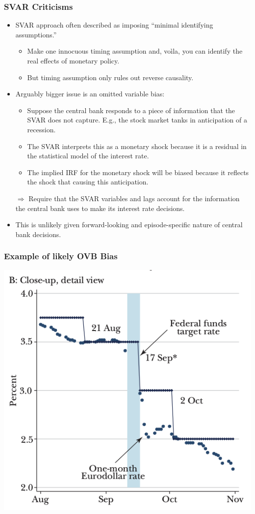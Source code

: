 \documentclass[english,xcolor=svgnames]{beamer}
\begin{document}
\begin{frame}
\frametitle{SVAR Criticisms
}
\begin{itemize}
	\item SVAR approach often described as imposing ``minimal identifying assumptions.''
	\begin{itemize}
		\item Make one innocuous timing assumption and, vo\`{i}la, you can identify the real effects of monetary policy.
		\item But timing assumption only rules out reverse causality.
	\end{itemize}
	\item Arguably bigger issue is an omitted variable bias:
	\begin{itemize}
		\item Suppose the central bank responds to a piece of information that the SVAR does not capture. E.g., the stock market tanks in anticipation of a recession.
		\item The SVAR interprets this as a monetary shock because it is a residual in the statistical model of the interest rate.
		\item The implied IRF for the monetary shock will be biased because it reflects the shock that causing this anticipation.
	\end{itemize} 
	\item[$\Rightarrow$] Require that the SVAR variables and lags account for the information the central bank uses to make its interest rate decisions.
	\item This is unlikely given forward-looking and episode-specific nature of central bank decisions.
\end{itemize}
\end{frame}

\begin{frame}
\frametitle{Example of likely OVB Bias
}
\centering
\includegraphics[scale=0.8]{../../Images/NS2018911.png}
\end{frame}
\end{document}
